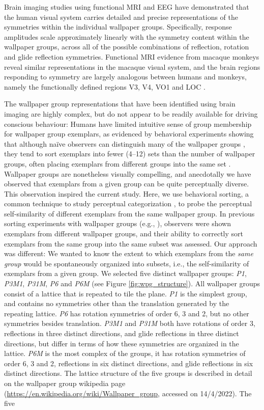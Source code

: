 \documentclass[symmetry,article,accept,pdftex,moreauthors]{Definitions/mdpi}
\begin{document}
Brain imaging studies using functional MRI \citep{RN1725} and EEG \citep{RN1959,kohler_clarke_2021} have demonstrated that the human visual system carries detailed and precise representations of the symmetries within the individual wallpaper groups. Specifically, response amplitudes scale approximately linearly with the symmetry content within the wallpaper groups, across all of the possible combinations of reflection, rotation and glide reflection symmetries. Functional MRI evidence from macaque monkeys reveal similar representations in the macaque visual system, and the brain regions responding to symmetry are largely analogous between humans and monkeys, namely the functionally defined regions V3, V4, VO1 and LOC \citep{audurier_symmetry_2021}.


The wallpaper group representations that have been identified using brain imaging are highly complex, but do not appear to be readily available for driving conscious behaviour: Humans have limited intuitive sense of group membership for wallpaper group exemplars, as evidenced by behavioral experiments showing that although naïve observers can distinguish many of the wallpaper groups \citep{RN1253}, they tend to sort exemplars into fewer (4--12) sets than the number of wallpaper groups, often placing exemplars from different groups into the same set \citep{RN172}. Wallpaper groups are nonetheless visually compelling, and anecdotally we have observed that exemplars from a given group can be quite perceptually diverse. This observation inspired the current study. Here, we use behavioral sorting, a common technique to study perceptual categorization \citep{Milton2008-ez,Pothos2011-vi}, to probe the perceptual self-similarity of different exemplars from the same wallpaper group. In previous sorting experiments with wallpaper groups (e.g., \citep{RN172}), observers were shown exemplars from different wallpaper groups, and their ability to correctly sort exemplars from the same group into the same subset was assessed. Our approach was different: We wanted to know the extent to which exemplars from the \textit{same group} would be spontaneously organized into subsets, i.e., the self-similarity of exemplars from a given group. We selected five distinct wallpaper groups: \textit{P1}, \textit{P3M1}, \textit{P31M}, \textit{P6} and \textit{P6M} (see Figure \ref{fig:wpg_structure}). All wallpaper groups consist of a lattice that is repeated to tile the plane. \textit{P1} is the simplest group, and contains no symmetries other than the translation generated by the repeating lattice. \textit{P6} has rotation symmetries of order 6, 3 and 2, but no other symmetries besides translation. \textit{P3M1} and \textit{P31M} both have rotations of order 3, reflections in three distinct directions, and glide reflections in three distinct directions, but differ in terms of how these symmetries are organized in the lattice. \textit{P6M} is the most complex of the groups, it has rotation symmetries of order 6, 3 and 2, reflections in six distinct directions, and glide reflections in six distinct directions. The lattice structure of the five groups is described in detail on the wallpaper group wikipedia page (\url{https://en.wikipedia.org/wiki/Wallpaper_group}, accessed on 14/4/2022). The five 
\end{document}
